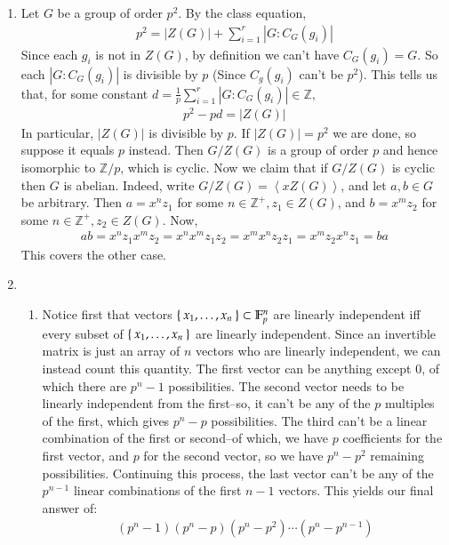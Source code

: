 \documentclass[12pt]{article}
\theoremstyle{definitionstyle}
\def\mbb#1{\mathbb{#1}}
\newcommand{\Z}{\mbb Z}
\newcommand{\gen}[1]{\left\langle #1 \right\rangle}
\newcommand{\F}{\mbb F}
\begin{document}
\begin{enumerate}[leftmargin=\labelsep]
		\item Let $G$ be a group of order $p^2$. By the class equation, 
		\begin{align*}
			p^2 = |Z(G)| + \sum_{i=1}^r |G : C_G(g_i)|
		\end{align*}
		Since each $g_i$ is not in $Z(G)$, by definition we can't have $C_G(g_i) = G$. So each $|G : C_G(g_i)|$ is divisible by $p$ (Since $C_g(g_i)$ can't be $p^2$). This tells us that, for some constant $d = \frac1p \sum_{i=1}^r |G : C_G(g_i)| \in \Z$,
		\begin{align*}
			p^2 - p d = |Z(G)|
		\end{align*}
		In particular, $|Z(G)|$ is divisible by $p$. If $|Z(G)| = p^2$ we are done, so suppose it equals $p$ instead. Then $G/Z(G)$ is a group of order $p$ and hence isomorphic to $\Z / p$, which is cyclic. Now we claim that if $G/Z(G)$ is cyclic then $G$ is abelian. Indeed, write $G/Z(G) = \gen{xZ(G)}$, and let $a, b \in G$ be arbitrary. Then $a = x^nz_1$ for some $n \in \Z^+, z_1 \in Z(G)$, and $b = x^mz_2$ for some $n \in \Z^+, z_2 \in Z(G)$. Now,
		\begin{align*}
			ab = x^nz_1 x^m z_2 = x^n x^mz_1z_2 = x^m x^n z_2 z_1 = x^mz_2 x^nz_1 = ba
		\end{align*}
		This covers the other case.
		
		\item \begin{enumerate}
			\item Notice first that vectors $\Set{x_1, \ldots, x_n} \subset \F_p^n$ are linearly independent iff every subset of $\Set{x_1, \ldots, x_n}$ are linearly independent. Since an invertible matrix is just an array of $n$ vectors who are linearly independent, we can instead count this quantity. The first vector can be anything except 0, of which there are $p^n - 1$ possibilities. The second vector needs to be linearly independent from the first--so, it can't be any of the $p$ multiples of the first, which gives $p^n - p$ possibilities. The third can't be a linear combination of the first or second--of which, we have $p$ coefficients for the first vector, and $p$ for the second vector, so we have $p^n-p^2$ remaining possibilities. Continuing this process, the last vector can't be any of the $p^{n-1}$ linear combinations of the first $n-1$ vectors. This yields our final answer of:
			\begin{align*}
				(p^n-1)(p^n-p)(p^n-p^2) \cdots (p^n-p^{n-1})
			\end{align*}
			

\end{enumerate}
\end{enumerate}
\end{document}
